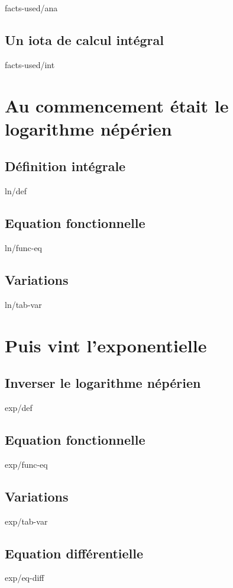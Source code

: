 \documentclass[12pt]{amsart}
\begin{document}
	{facts-used/ana}


	\subsection{Un iota de calcul intégral}

	{facts-used/int}




\section{Au commencement était le logarithme népérien}

	\subsection{Définition intégrale}

	{ln/def}


	\subsection{Equation fonctionnelle}

	{ln/func-eq}


	\subsection{Variations}

	{ln/tab-var}




\section{Puis vint l'exponentielle}

	\subsection{Inverser le logarithme népérien}

	{exp/def}


	\subsection{Equation fonctionnelle}

	{exp/func-eq}


	\subsection{Variations}

	{exp/tab-var}


	\subsection{Equation différentielle}

	{exp/eq-diff}
\end{document}
